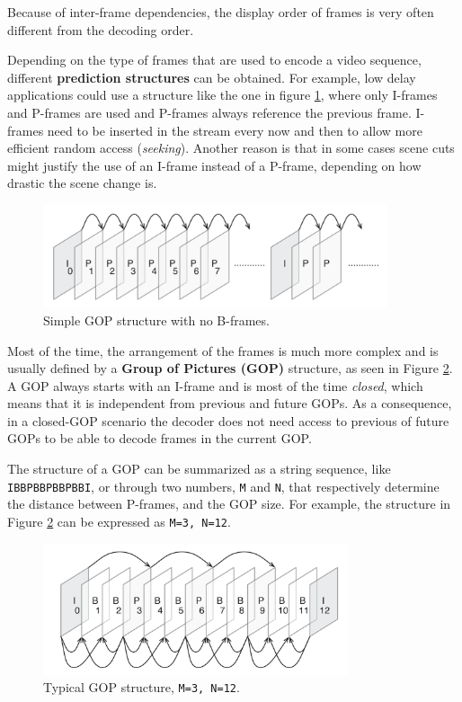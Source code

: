 Because of inter-frame dependencies, the display order of frames is very often different from the decoding order.

Depending on the type of frames that are used to encode a video sequence, different \textbf{prediction structures} can be obtained. For example, low delay applications could use a structure like the one in figure \ref{fig:codec_gop1}, where only I-frames and P-frames are used and P-frames always reference the previous frame. I-frames need to be inserted in the stream every now and then to allow more efficient random access (\textit{seeking}). Another reason is that in some cases scene cuts might justify the use of an I-frame instead of a P-frame, depending on how drastic the scene change is.

\begin{figure}
	\centering
	
	\includegraphics[width=0.9\textwidth]{res/gop1.png}
	
	\caption{Simple GOP structure with no B-frames.}
	\label{fig:codec_gop1}
\end{figure}

Most of the time, the arrangement of the frames is much more complex and is usually defined by a \textbf{Group of Pictures (GOP)} structure, as seen in Figure \ref{fig:codec_gop2}. A GOP always starts with an I-frame and is most of the time \textit{closed}, which means that it is independent from previous and future GOPs. As a consequence, in a closed-GOP scenario the decoder does not need access to previous of future GOPs to be able to decode frames in the current GOP.

The structure of a GOP can be summarized as a string sequence, like \texttt{IBBPBBPBBPBBI}, or through two numbers, \texttt{M} and \texttt{N}, that respectively determine the distance between P-frames, and the GOP size. For example, the structure in Figure \ref{fig:codec_gop2} can be expressed as \texttt{M=3, N=12}.

\begin{figure}
	\centering
	
	\includegraphics[width=0.8\textwidth]{res/gop2.png}
	
	\caption{Typical GOP structure, \texttt{M=3, N=12}.}
	\label{fig:codec_gop2}
\end{figure}

